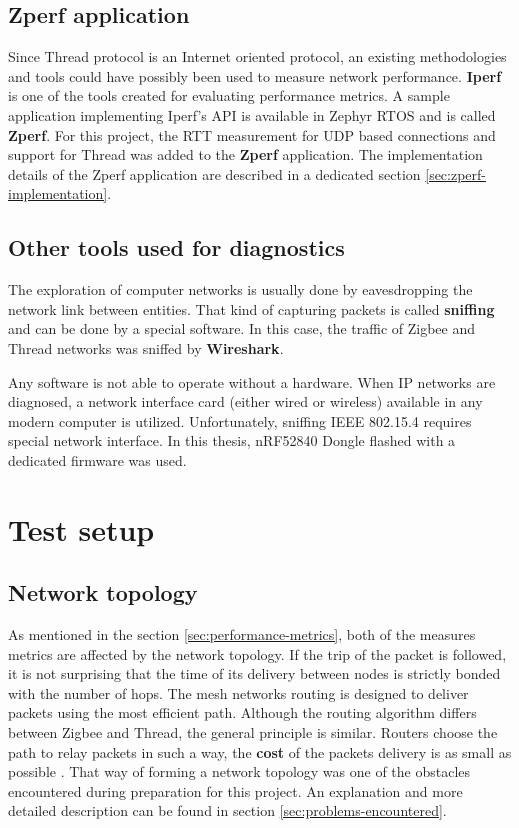 \subsection{Zperf application}
\label{sec:zperf}

Since Thread protocol is an Internet oriented protocol, an existing methodologies and tools could have possibly been used to measure network performance. \textbf{Iperf} is one of the tools created for evaluating performance metrics. A sample application implementing Iperf's API is available in Zephyr RTOS and is called \textbf{Zperf}. For this project, the RTT measurement for UDP based connections and support for Thread was added to the \textbf{Zperf} application. The implementation details of the Zperf application are described in a dedicated section \ref{sec:zperf-implementation}.

\subsection{Other tools used for diagnostics}
\label{sec:tools}

The exploration of computer networks is usually done by eavesdropping the network link between entities. That kind of capturing packets is called \textbf{sniffing} and can be done by a special software. In this case, the traffic of Zigbee and Thread networks was sniffed by \textbf{Wireshark}. 

Any software is not able to operate without a hardware. When IP networks are diagnosed, a network 
interface card (either wired or wireless) available in any modern computer is utilized. Unfortunately, 
sniffing IEEE 802.15.4 requires special network interface. In this thesis, nRF52840 Dongle flashed with 
a dedicated firmware was used.

\medskip
\section{Test setup}
\subsection{Network topology}
\label{sec:network-topology}

As mentioned in the section \ref{sec:performance-metrics}, both of the measures metrics are affected by
the network topology. If the trip of the packet is followed, it is not surprising that the time of its 
delivery between nodes is strictly bonded with the number of hops. The mesh networks routing is designed to deliver packets using the most efficient path. Although the routing algorithm differs between Zigbee and Thread,
the general principle is similar. Routers choose the path to relay packets in such a way, the \textbf{cost}
of the packets delivery is as small as possible \cite{TexasZigbeeVsThread}. That way of forming a network topology
was one of the obstacles encountered during preparation for this project. An explanation and more detailed
description can be found in section \ref{sec:problems-encountered}.

